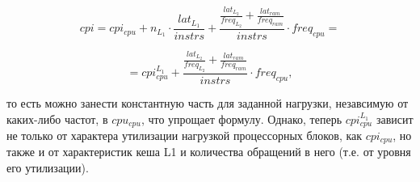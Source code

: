     \begin{equation}
        cpi = cpi_{cpu} + n_{L_1} \cdot \frac{lat_{L_1}}{instrs} + \frac{\frac{lat_{L_2}}{freq_{L_2}} +
        \frac{lat_{ram}}{freq_{ram}}}{instrs} \cdot freq_{cpu} =
    \end{equation}

    \begin{equation}
        = cpi_{cpu}^{L_1} + \frac{\frac{lat_{L_2}}{freq_{L_2}} +
        \frac{lat_{ram}}{freq_{ram}}}{instrs} \cdot freq_{cpu},
    \end{equation}

    то есть можно занести константную часть для заданной нагрузки, незавсимую от каких-либо частот,
    в $cpu_{cpu}$, что упрощает формулу. Однако, теперь $cpi_{cpu}^{L_1}$ зависит не только от характера
    утилизации нагрузкой процессорных блоков, как $cpi_{cpu}$, но также и от характеристик кеша L1 и
    количества обращений в него (т.е. от уровня его утилизации).

\newpage
